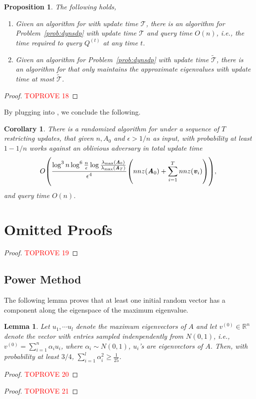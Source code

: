 \documentclass[11pt]{article}
\newtheorem{lemma}[theorem]{Lemma}
\newtheorem{corollary}[theorem]{Corollary}
\newtheorem{proposition}[theorem]{Proposition}
\let\originalleft\left
\let\originalright\right
\renewcommand{\left}{\mathopen{}\mathclose\bgroup\originalleft}
\renewcommand{\right}{\aftergroup\egroup\originalright}
\newcommand\uu{\boldsymbol{\mathit{u}}}
\newcommand\vv{\boldsymbol{\mathit{v}}}
\renewcommand\AA{\boldsymbol{\mathit{A}}}
\newcommand\QQ{\boldsymbol{\mathit{Q}}}
\begin{document}
\begin{proposition}\label{prop:equiv sdp}
The following holds,
\begin{enumerate}
    \item Given an algorithm for  with update time $\mathcal{T}$, there is an algorithm for Problem~\ref{prob:dynsdp} with update time 
 $\mathcal{T}$ and query time $O(n)$, i.e., the time required to query $\QQ^{(t)}$ at any time $t$. 
    \item Given an algorithm for Problem~\ref{prob:dynsdp} with update time $\widetilde{\mathcal{T}}$, there is an algorithm for  that only maintains the approximate eigenvalues with update time at most $\widetilde{\mathcal{T}}$.
\end{enumerate}
\end{proposition}
\begin{proof}\textcolor{red}{TOPROVE 18}\end{proof}

By plugging  into , we conclude the following.
\begin{corollary} There is a randomized algorithm for  under a sequence of $T$ restricting updates, that given $n, \AA_0$ and $\epsilon>1/n$ as input, with probability at least $1-1/n$ works against an oblivious adversary in total update time
\[
 O\left(\frac{\log^{3}n \log^6 \frac{n}{\epsilon}\log \frac{\lambda_{\max}(\AA_0)}{\lambda_{\max}(\AA_T)}}{\epsilon^{4}}\left(nnz(\AA_0) + \sum_{i=1}^T nnz(\vv_i)\right) \right),
 \]
and query time $O(n)$.
\end{corollary}         

\section{Omitted Proofs}
\Decision*
\begin{proof}\textcolor{red}{TOPROVE 19}\end{proof}

\subsection*{Power Method}

The following lemma proves that at least one initial random vector has a component along the eigenspace of the maximum eigenvalue.
\begin{lemma}\label{lem:PMHighComp}
Let $\uu_1,\cdots \uu_l$ denote the maximum eigenvectors of $\AA$ and let $\vv^{(0)} \in \mathbb{R}^n$ denote the vector with entries sampled indenpendently from $N(0,1)$, i.e., $\vv^{(0)} = \sum_{i=1}^n\alpha_i\uu_i$, where $\alpha_i \sim N(0,1)$, $\uu_i$'s are eigenvectors of $\AA$. Then, with probability at least $3/4$, $\sum_{i=1}^l\alpha_i^2 \geq \frac{1}{25}$.
\end{lemma}
\begin{proof}\textcolor{red}{TOPROVE 20}\end{proof}

\PowerMethod*
\begin{proof}\textcolor{red}{TOPROVE 21}\end{proof}

         
\end{document}
